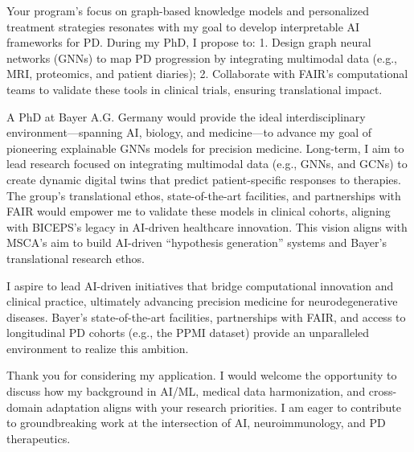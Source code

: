 \documentclass[11pt,a4paper, final]{moderncv}
\begin{document}
Your program's focus on graph-based knowledge models and personalized treatment strategies resonates with my goal to develop interpretable AI frameworks for PD. 
During my PhD, I propose to: 
1. Design graph neural networks (GNNs) to map PD progression by integrating multimodal data (e.g., MRI, proteomics, and patient diaries); 
2. Collaborate with FAIR's computational teams to validate these tools in clinical trials, ensuring translational impact.

A PhD at Bayer A.G. Germany would provide the ideal interdisciplinary environment—spanning AI, biology, and medicine—to advance my goal of pioneering explainable GNNs models for precision medicine. 
Long-term, I aim to lead research focused on integrating multimodal data (e.g., GNNs, and GCNs) to create dynamic digital twins that predict patient-specific responses to therapies. 
The group's translational ethos, state-of-the-art facilities, and partnerships with FAIR would empower me to validate these models in clinical cohorts, aligning with BICEPS's legacy in AI-driven healthcare innovation. 
This vision aligns with MSCA's aim to build AI-driven “hypothesis generation” systems and Bayer's translational research ethos.

I aspire to lead AI-driven initiatives that bridge computational innovation and clinical practice, ultimately advancing precision medicine for neurodegenerative diseases. 
Bayer's state-of-the-art facilities, partnerships with FAIR, and access to longitudinal PD cohorts (e.g., the PPMI dataset) provide an unparalleled environment to realize this ambition.

Thank you for considering my application. 
I would welcome the opportunity to discuss how my background in AI/ML, medical data harmonization, and cross-domain adaptation aligns with your research priorities. 
I am eager to contribute to groundbreaking work at the intersection of AI, neuroimmunology, and PD therapeutics.

\makeletterclosing
\end{document}
